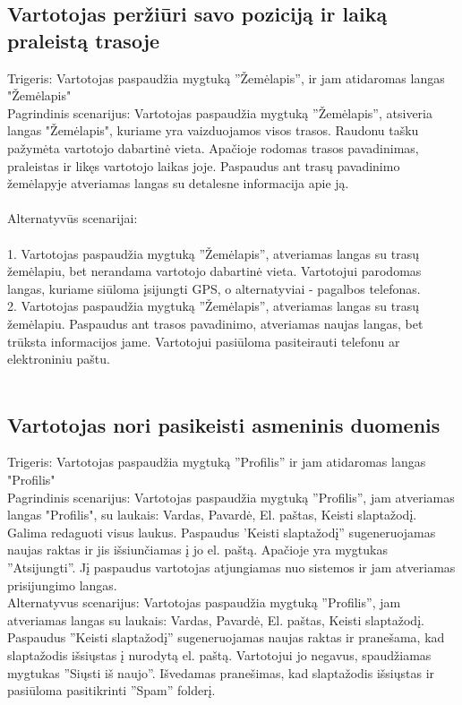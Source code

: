 \documentclass[oneside]{VUMIFPSkursinis}
\begin{document}
\subsection{Vartotojas peržiūri savo poziciją ir laiką praleistą trasoje}
	Trigeris: Vartotojas paspaudžia mygtuką ''Žemėlapis'', ir jam atidaromas langas "Žemėlapis"\\
	Pagrindinis scenarijus: Vartotojas paspaudžia mygtuką ''Žemėlapis'', atsiveria langas "Žemėlapis", kuriame yra vaizduojamos visos trasos. Raudonu tašku pažymėta vartotojo dabartinė vieta. Apačioje rodomas trasos pavadinimas, praleistas ir likęs vartotojo laikas joje. Paspaudus ant trasų pavadinimo žemėlapyje atveriamas langas su detalesne informacija apie ją.\\ \\
Alternatyvūs scenarijai:  \\ \\
1. Vartotojas paspaudžia mygtuką ''Žemėlapis'', atveriamas langas su trasų žemėlapiu, bet nerandama vartotojo dabartinė vieta. Vartotojui parodomas langas, kuriame siūloma įsijungti GPS, o alternatyviai - pagalbos telefonas.\\
2. Vartotojas paspaudžia mygtuką ''Žemėlapis'', atveriamas langas su trasų žemėlapiu. Paspaudus ant trasos pavadinimo, atveriamas naujas langas, bet trūksta informacijos jame.  Vartotojui pasiūloma pasiteirauti telefonu ar elektroniniu paštu. \\ \\ 

\subsection{Vartotojas nori pasikeisti asmeninis duomenis}
Trigeris: Vartotojas paspaudžia mygtuką ''Profilis'' ir jam atidaromas langas "Profilis" \\
	Pagrindinis scenarijus: Vartotojas paspaudžia mygtuką ''Profilis'', jam atveriamas langas "Profilis", su laukais: Vardas, Pavardė, El. paštas, Keisti slaptažodį. Galima redaguoti visus laukus. Paspaudus 'Keisti slaptažodį'' sugeneruojamas naujas raktas ir jis išsiunčiamas į jo el. paštą. Apačioje yra mygtukas ''Atsijungti''. Jį paspaudus vartotojas atjungiamas nuo sistemos ir jam atveriamas prisijungimo langas.\\
Alternatyvus scenarijus: Vartotojas paspaudžia mygtuką ''Profilis'', jam atveriamas langas su laukais: Vardas, Pavardė, El. paštas, Keisti slaptažodį.  Paspaudus ''Keisti slaptažodį'' sugeneruojamas naujas raktas ir pranešama, kad slaptažodis išsiųstas į nurodytą el. paštą. Vartotojui jo negavus, spaudžiamas mygtukas ''Siųsti iš naujo''. Išvedamas pranešimas, kad slaptažodis išsiųstas ir pasiūloma pasitikrinti  ''Spam'' folderį. \\ \\ 
\end{document}
